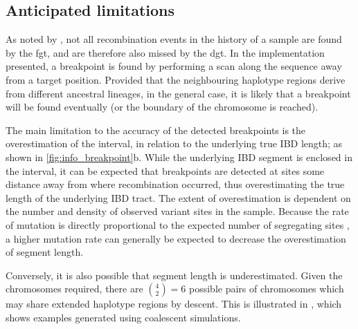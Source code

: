 %
\subsection{Anticipated limitations}\label{sec:ibd_detect_lim}
%

As noted by \citet{Hudson:1985wh}, not all recombination events in the history of a sample are found by the \gls{fgt}, and are therefore also missed by the \gls{dgt}.
In the implementation presented, a breakpoint is found by performing a scan along the sequence away from a target position.
Provided that the neighbouring haplotype regions derive from different ancestral lineages, in the general case, it is likely that a breakpoint will be found eventually (or the boundary of the chromosome is reached).

The main limitation to the accuracy of the detected breakpoints is the overestimation of the interval, in relation to the underlying true IBD length; as shown in \cref{fig:info_breakpoint}{b}.
While the underlying IBD segment is enclosed in the interval, it can be expected that breakpoints are detected at sites some distance away from where recombination occurred, thus overestimating the true length of the underlying IBD tract.
The extent of overestimation is dependent on the number and density of observed variant sites in the sample.
Because the rate of mutation is directly proportional to the expected number of segregating sites \citep{Watterson:1975ur}, a higher mutation rate can generally be expected to decrease the overestimation of segment length.



%

%

Conversely, it is also possible that segment length is underestimated.
Given the  chromosomes required, there are ${{{4}\choose{2}}=6}$ possible pairs of chromosomes which may share extended haplotype regions by descent.
This is illustrated in , which shows  examples generated using coalescent simulations.


